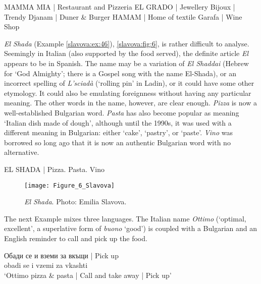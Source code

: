 \documentclass[output=paper]{langscibook}
\begin{document}
\begin{exe}
  \ex\label{slavova:ex:40} MAMMA MIA | Restaurant and Pizzeria 
  \ex\label{slavova:ex:41} EL GRADO | Jewellery 
  \ex\label{slavova:ex:42} Bijoux | Trendy 
  \ex\label{slavova:ex:43} Djanam | Duner \& Burger 
  \ex\label{slavova:ex:44} HAMAM | Home of textile 
  \ex\label{slavova:ex:45} Garafa | Wine Shop
\end{exe}

\noindent
\textit{El Shada} (Example \ref{slavova:ex:46}), \autoref{slavova:fig:6}, is rather difficult to analyse. Seemingly in Italian (also supported by the food served), the definite article \textit{El} appears to be in Spanish. The name may be a variation of \textit{El Shaddai} (Hebrew for ‘God Almighty’; there is a Gospel song with the name El-Shada), or an incorrect spelling of \textit{L’sciadà} (‘rolling pin’ in Ladin), or it could have some other etymology. It could also be emulating foreignness without having any particular meaning. The other words in the name, however, are clear enough. \textit{Pizza} is now a well-established Bulgarian word. \textit{Pasta} has also become popular as meaning ‘Italian dish made of dough’, although until the 1990s, it was used with a different meaning in Bulgarian: either ‘cake’, ‘pastry’, or ‘paste’. \textit{Vino} was borrowed so long ago that it is now an authentic Bulgarian word with no alternative.

\begin{exe}
  \ex\label{slavova:ex:46} EL SHADA | Pizza. Pasta. Vino
\end{exe}

\begin{figure} %
  \texttt{[image: Figure\_6\_Slavova]}
  \caption{\textit{El Shada}. Photo: Emilia Slavova.}
  \label{slavova:fig:6}
\end{figure}

\noindent
The next Example  mixes three languages. The Italian name \textit{Ottimo}  (‘optimal, excellent’, a superlative form of \textit{buono} ‘good’) is coupled with a Bulgarian and an English reminder to call and pick up the food.

\begin{exe}
  \ex\label{slavova:ex:47} 
   Обади се и вземи за вкъщи {| Pick up} \\
  { } obadi se i vzemi za vkashti { } \\
  \glt ‘Ottimo pizza \& pasta | Call and take away | Pick up’
\end{exe}
\end{document}
